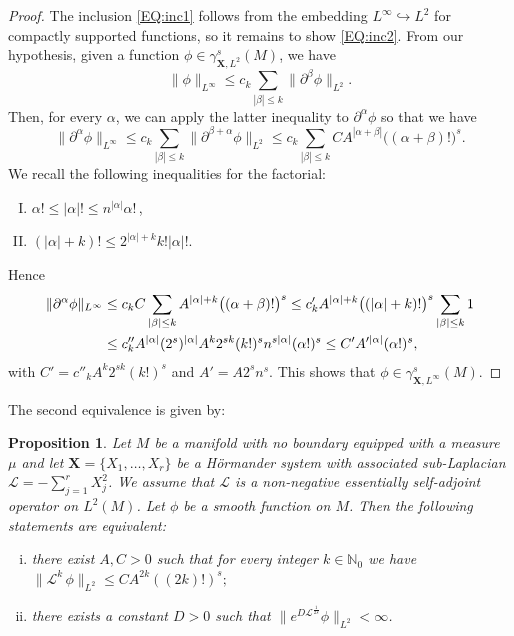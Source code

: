 \documentclass[12pt,oneside,a4paper]{book}
\numberwithin{equation}{section}     %
\theoremstyle{plain}
\newtheorem{proposition}[theorem]{Proposition}
\theoremstyle{definition}
\newcommand{\N}{{\mathbb N}}
\newcommand{\slp}{{\mathcal L}}
\begin{document}
\begin{proof}
	The inclusion \eqref{EQ:inc1} follows from the embedding $L^\infty\hookrightarrow L^2$ for compactly supported functions, so it remains to show \eqref{EQ:inc2}.
	From our hypothesis, given a function $\phi\in\gamma^s_{\mathbf{X}, L^2}(M)$, we have
	\[
	\|\phi\|_{L^\infty}\leq c_k\sum_{|\beta|\leq k}\|\partial^\beta\phi\|_{L^2}.
	\] 
	Then, for every $\alpha$, we can apply the latter inequality to $\partial^{\alpha}\phi$ so that we have
	\[
	\|\partial^\alpha\phi\|_{L^\infty}\leq c_k\sum_{|\beta|\leq k}\|\partial^{\beta+\alpha}\phi\|_{L^2}\leq c_k\sum_{|\beta|\leq k}C A^{|\alpha+\beta|}\big( (\alpha+\beta)!\big)^s.
	\]
	We recall the following inequalities for the factorial:
	\begin{enumerate}[I.]
		\item $\alpha!\leq|\alpha|!\leq n^{|\alpha|}\alpha!$\,,
		\item $(|\alpha|+k)!\leq 2^{|\alpha|+k}k!|\alpha|!$.
	\end{enumerate}
	Hence
	\begin{align}\notag
	\|\partial^\alpha\phi\|_{L^\infty}&\leq c_kC\sum_{|\beta|\leq k}A^{|\alpha|+k}\big((\alpha+\beta)!\big)^s \leq c'_kA^{|\alpha|+k}\big((|\alpha|+k)!\big)^s\sum_{|\beta|\leq k}1\\\notag
	&\leq c''_kA^{|\alpha|}(2^s)^{|\alpha|}A^k2^{sk}(k!)^sn^{s|\alpha|}(\alpha!)^s\leq C' A'^{|\alpha|}(\alpha!)^s,
	\end{align}
	with $C'=c''_kA^k2^{sk}(k!)^s$ and $A'=A2^sn^s$. This shows that $\phi\in  \gamma^s_{\mathbf{X},L^{\infty}}(M)$.
\end{proof}

The second equivalence is given by:

\begin{proposition}\label{PROP:prop2}
	Let $M$ be a manifold with no boundary equipped with a measure $\mu$ and let $\mathbf{X} =\{X_1,\dots,X_r\}$ be a H\"ormander system with associated sub-Laplacian $\slp=-\sum_{j=1}^rX_j^2$. We assume that $\slp$ is a non-negative essentially self-adjoint operator on $L^2(M)$. Let $\phi$ be a smooth function on $M$. Then the following statements are equivalent:
	\begin{enumerate}[i.]
		\item  there exist $A,C>0$ such that for every integer $k\in\N_0$ we have $\|\slp^k\, \phi\|_{L^2}\leq C A^{2k}((2k)!)^s;$
		\item there exists a constant $D>0$ such that $\|e^{D\slp^{\frac{1}{2s}}}\phi\|_{L^2}<\infty$.
	\end{enumerate}
\end{proposition}
\end{document}
